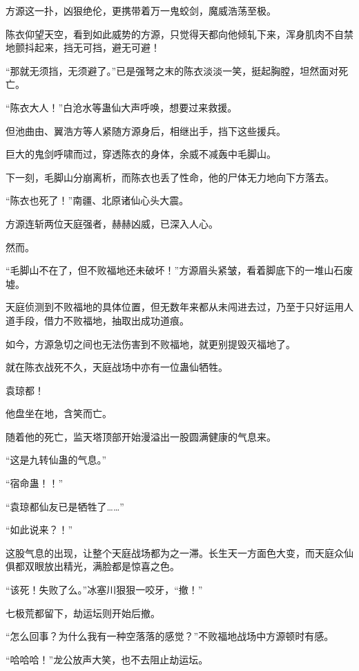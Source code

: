 
\begin{this_body}

方源这一扑，凶狠绝伦，更携带着万一鬼蛟剑，魔威浩荡至极。

陈衣仰望天空，看到如此威势的方源，只觉得天都向他倾轧下来，浑身肌肉不自禁地颤抖起来，挡无可挡，避无可避！

“那就无须挡，无须避了。”已是强弩之末的陈衣淡淡一笑，挺起胸膛，坦然面对死亡。

“陈衣大人！”白沧水等蛊仙大声呼唤，想要过来救援。

但池曲由、翼浩方等人紧随方源身后，相继出手，挡下这些援兵。

巨大的鬼剑呼啸而过，穿透陈衣的身体，余威不减轰中毛脚山。

下一刻，毛脚山分崩离析，而陈衣也丢了性命，他的尸体无力地向下方落去。

“陈衣也死了！”南疆、北原诸仙心头大震。

方源连斩两位天庭强者，赫赫凶威，已深入人心。

然而。

“毛脚山不在了，但不败福地还未破坏！”方源眉头紧皱，看着脚底下的一堆山石废墟。

天庭侦测到不败福地的具体位置，但无数年来都从未闯进去过，乃至于只好运用人道手段，借力不败福地，抽取出成功道痕。

如今，方源急切之间也无法伤害到不败福地，就更别提毁灭福地了。

就在陈衣战死不久，天庭战场中亦有一位蛊仙牺牲。

袁琼都！

他盘坐在地，含笑而亡。

随着他的死亡，监天塔顶部开始漫溢出一股圆满健康的气息来。

“这是九转仙蛊的气息。”

“宿命蛊！！”

“袁琼都仙友已是牺牲了……”

“如此说来？！”

这股气息的出现，让整个天庭战场都为之一滞。长生天一方面色大变，而天庭众仙俱都双眼放出精光，满脸都是惊喜之色。

“该死！失败了么。”冰塞川狠狠一咬牙，“撤！”

七极荒都留下，劫运坛则开始后撤。

“怎么回事？为什么我有一种空落落的感觉？”不败福地战场中方源顿时有感。

“哈哈哈！”龙公放声大笑，也不去阻止劫运坛。


\end{this_body}
